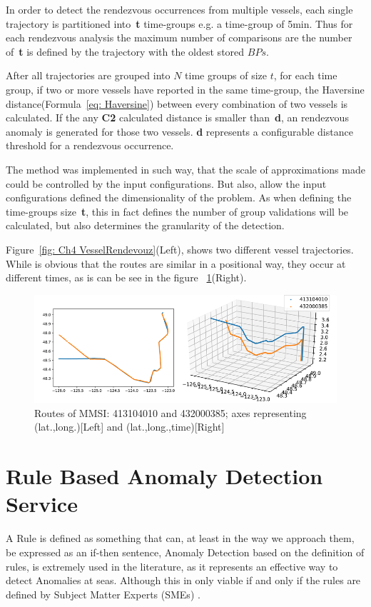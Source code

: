 In order to detect the rendezvous occurrences from multiple vessels, each single trajectory is partitioned into~\textbf{t} time-groups e.g. a time-group of 5min. Thus for each rendezvous analysis the maximum number of comparisons are the number of~\textbf{t} is defined by the trajectory with the oldest stored $BPs$.  

After all trajectories are grouped into $N$ time groups of size $t$, for each time group, if two or more vessels have reported in the same time-group, the Haversine distance(Formula~\ref{eq: Haversine}) between every combination of two vessels is calculated. If the any \textbf{C2} calculated distance is smaller than~\textbf{d}, an rendezvous anomaly is generated for those two vessels. \textbf{d} represents a configurable distance threshold for a rendezvous occurrence.

The method was implemented in such way, that the scale of approximations made could be controlled by the input configurations. But also, allow the input configurations defined the dimensionality of the problem. As when defining the time-groups size~\textbf{t}, this in fact defines the number of group validations will be calculated, but also determines the granularity of the detection.

Figure~\ref{fig:  Ch4 VesselRendevouz}(Left), shows two different vessel trajectories. While is obvious that the routes are similar in a positional way, they occur at different times, as is can be see in the figure ~\ref{fig: Ch4 VesselRendevouz}(Right).

\begin{figure}[H]
\centering
\includegraphics[width=\textwidth]{figures/Ch4/VesselRendevouz.png}
\caption{Routes of MMSI: 413104010 and 432000385; axes representing (lat.,long.)[Left]
and (lat.,long.,time)[Right]}
\label{fig: Ch4 VesselRendevouz}
\end{figure}





\section{Rule Based Anomaly Detection Service}
\label{section: 4 Rule Based Anomaly Detection}
A Rule is defined as something that can, at least in the way we approach them, be expressed as an if-then sentence, \cite{Edlund2006RuleSea-Surveillance}
Anomaly Detection based on the definition of rules, is extremely used in the literature, as it represents an effective way to detect Anomalies at seas. Although this in only viable if and only if the rules are defined by Subject Matter Experts (SMEs) \cite{Boinepalli2014AAlgorithm, Will2011FastProcesses}.

